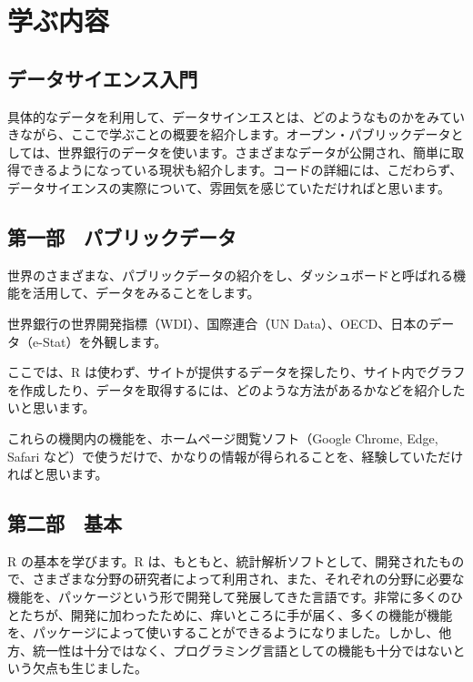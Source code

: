 \documentclass[
  xelatex, ja=standard]{bxjsbook}
\theoremstyle{definition}
\theoremstyle{definition}
\theoremstyle{definition}
\theoremstyle{definition}
\theoremstyle{remark}
\begin{document}
\hypertarget{what2learn}{%
\chapter{学ぶ内容　}\label{what2learn}}

\hypertarget{ux30c7ux30fcux30bfux30b5ux30a4ux30a8ux30f3ux30b9ux5165ux9580}{%
\section{データサイエンス入門}\label{ux30c7ux30fcux30bfux30b5ux30a4ux30a8ux30f3ux30b9ux5165ux9580}}

具体的なデータを利用して、データサインエスとは、どのようなものかをみていきながら、ここで学ぶことの概要を紹介します。オープン・パブリックデータとしては、世界銀行のデータを使います。さまざまなデータが公開され、簡単に取得できるようになっている現状も紹介します。コードの詳細には、こだわらず、データサイエンスの実際について、雰囲気を感じていただければと思います。

\hypertarget{ux7b2cux4e00ux90e8-ux30d1ux30d6ux30eaux30c3ux30afux30c7ux30fcux30bf}{%
\section{第一部　パブリックデータ}\label{ux7b2cux4e00ux90e8-ux30d1ux30d6ux30eaux30c3ux30afux30c7ux30fcux30bf}}

世界のさまざまな、パブリックデータの紹介をし、ダッシュボードと呼ばれる機能を活用して、データをみることをします。

世界銀行の世界開発指標（WDI）、国際連合（UN Data）、OECD、日本のデータ（e-Stat）を外観します。

ここでは、R は使わず、サイトが提供するデータを探したり、サイト内でグラフを作成したり、データを取得するには、どのような方法があるかなどを紹介したいと思います。

これらの機関内の機能を、ホームページ閲覧ソフト（Google Chrome, Edge, Safari など）で使うだけで、かなりの情報が得られることを、経験していただければと思います。

\hypertarget{ux7b2cux4e8cux90e8-ux57faux672c}{%
\section{第二部　基本}\label{ux7b2cux4e8cux90e8-ux57faux672c}}

R の基本を学びます。R は、もともと、統計解析ソフトとして、開発されたもので、さまざまな分野の研究者によって利用され、また、それぞれの分野に必要な機能を、パッケージという形で開発して発展してきた言語です。非常に多くのひとたちが、開発に加わったために、痒いところに手が届く、多くの機能が機能を、パッケージによって使いすることができるようになりました。しかし、他方、統一性は十分ではなく、プログラミング言語としての機能も十分ではないという欠点も生じました。
\end{document}
